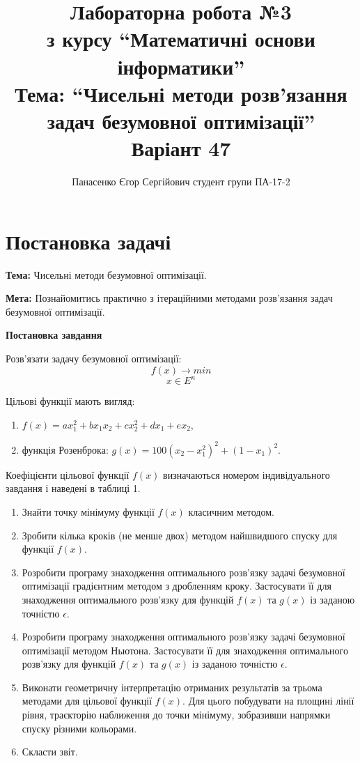 \documentclass[14pt,a4paper]{extarticle}
\title{%
  \textbf{Лабораторна робота №3}\\
  \large з курсу ``Математичні основи інформатики''\\
  Тема: ``Чисельні методи розв’язання задач безумовної оптимізації''\\
  Варіант 47}
\author{Панасенко Єгор Сергійович \newline студент групи ПА-17-2}
\date{}
\theoremstyle{definition}
\renewcommand{\[}{\begin{dmath*}[compact]}
\renewcommand{\]}{\end{dmath*}}
\begin{document}
\sloppy %
\allowdisplaybreaks %

\maketitle
\thispagestyle{empty}

\section{Постановка задачі}

\textbf{Тема:} Чисельні методи безумовної оптимізації.

\textbf{Мета:} Познайомитись практично з ітераційними методами розв'язання задач
безумовної оптимізації.

\textbf{Постановка завдання}

Розв'язати задачу безумовної оптимізації:
\begin{equation}
    f(x) \to min
\end{equation}
\begin{equation}
    x \in E^n
\end{equation}

Цільові функції мають вигляд:

\begin{enumerate}
\item $f(x)=ax_1^2+bx_1x_2+cx_2^2+dx_1+ex_2$,
\item функція Розенброка: $g(x)=100(x_2-x_1^2)^2+(1-x_1)^2$.
\end{enumerate}

Коефіцієнти цільової функції $f(x)$ визначаються номером індивідуального завдання і наведені в таблиці 1.

\begin{enumerate}
    \item Знайти точку мінімуму функції $f(x)$ класичним методом.

    \item Зробити кілька кроків (не менше двох) методом найшвидшого спуску для функції $f(x)$.

    \item Розробити програму знаходження оптимального розв'язку задачі безумовної оптимізації градієнтним методом з дробленням кроку.
    Застосувати її для знаходження оптимального розв'язку для функцій $f(x)$ та $g(x)$ із заданою точністю $\epsilon$.

    \item Розробити програму знаходження оптимального розв'язку задачі безумовної оптимізації методом Ньютона.
    Застосувати її для знаходження оптимального розв'язку для функцій $f(x)$ та $g(x)$ із заданою точністю $\epsilon$.

    \item Виконати геометричну інтерпретацію отриманих результатів за трьома методами для цільової функції $f(x)$.
    Для цього побудувати на площині лінії рівня, траєкторію наближення до точки мінімуму, зобразивши напрямки спуску різними кольорами.

    \item Скласти звіт.
\end{enumerate}
\end{document}
